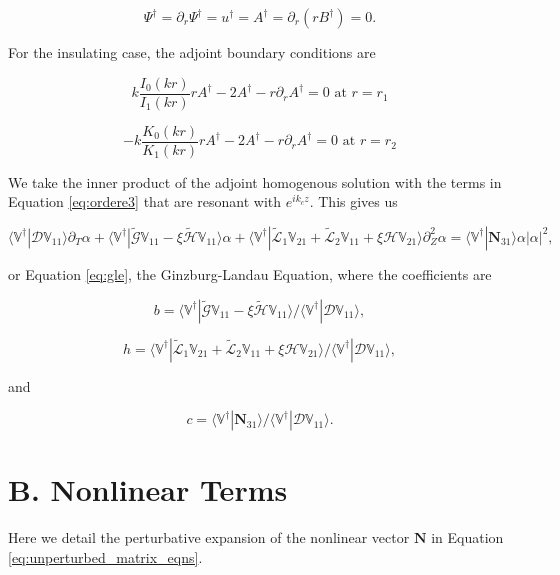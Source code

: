 \documentclass{emulateapj}
\newcommand{\beq}{\begin{equation}}
\newcommand{\eeq}{\end{equation}}
\begin{document}
\beq
\Psi^\dagger = \partial_r \Psi^\dagger = u^\dagger = A^\dagger = \partial_r (r B^\dagger) = 0.
\eeq

For the insulating case, the adjoint boundary conditions are

\beq
k \frac{I_0 (k r)}{I_1 (k r)} r A^\dagger - 2 A^\dagger - r \partial_r A^\dagger = 0 \, \, \mathrm{at} \, \,   r = r_1
\eeq

\beq
- k \frac{K_0 (k r)}{K_1 (k r)} r A^\dagger - 2 A^\dagger - r \partial_r A^\dagger = 0 \, \, \mathrm{at} \, \,   r = r_2
\eeq

We take the inner product of the adjoint homogenous solution with the terms in Equation \ref{eq:ordere3} that are resonant with $e^{i k_c z}$. This gives us

\beq
\langle \mathbb{V}^\dagger | \mathcal{D} \mathbb{V}_{11} \rangle \partial_T \alpha + \langle  \mathbb{V}^\dagger | \widetilde{\mathcal{G}} \mathbb{V}_{11} - \xi \widetilde{\mathcal{H}} \mathbb{V}_{11} \rangle \alpha +  \langle \mathbb{V}^\dagger | \widetilde{\mathcal{L}}_1 \mathbb{V}_{21} + \widetilde{\mathcal{L}}_2 \mathbb{V}_{11} + \xi \mathcal{H} \mathbb{V}_{21} \rangle \partial_Z^2 \alpha = \langle \mathbb{V}^\dagger | \mathbf{N}_{31} \rangle \alpha |\alpha|^2,
\eeq

or Equation \ref{eq:gle}, the Ginzburg-Landau Equation, where the coefficients are 

\beq
b = \langle  \mathbb{V}^\dagger | \widetilde{\mathcal{G}} \mathbb{V}_{11} - \xi \widetilde{\mathcal{H}} \mathbb{V}_{11} \rangle / \langle \mathbb{V}^\dagger | \mathcal{D} \mathbb{V}_{11} \rangle,
\eeq

\beq
h = \langle \mathbb{V}^\dagger | \widetilde{\mathcal{L}}_1 \mathbb{V}_{21} + \widetilde{\mathcal{L}}_2 \mathbb{V}_{11} + \xi \mathcal{H} \mathbb{V}_{21} \rangle / \langle \mathbb{V}^\dagger | \mathcal{D} \mathbb{V}_{11} \rangle,
\eeq

and

\beq
c = \langle \mathbb{V}^\dagger | \mathbf{N}_{31} \rangle / \langle \mathbb{V}^\dagger | \mathcal{D} \mathbb{V}_{11} \rangle. 
\eeq

\section{B. Nonlinear Terms}\label{app:nonlinear_terms}

Here we detail the perturbative expansion of the nonlinear vector $\mathbf{N}$ in Equation \ref{eq:unperturbed_matrix_eqns}. 
\end{document}
